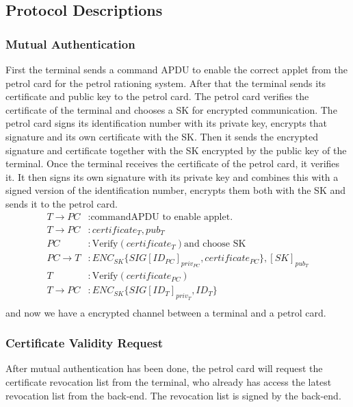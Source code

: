 \subsection{Protocol Descriptions}
\subsubsection{Mutual Authentication}
First the terminal sends a command APDU to enable the correct applet from the petrol card for the petrol rationing system. After that the terminal sends its certificate and public key to the petrol card. The petrol card verifies the certificate of the terminal and chooses a SK for encrypted communication. The petrol card signs its identification number with its private key, encrypts that signature and its own certificate with the SK. Then it sends the encrypted signature and certificate together with the SK encrypted by the public key of the terminal. Once the terminal receives the certificate of the petrol card, it verifies it. It then signs its own signature with its private key and combines this with a signed version of the identification number, encrypts them both with the SK and sends it to the petrol card.
\\

\begin{equation}\nonumber
\begin{split} 
T \to PC &: \text{commandAPDU to enable applet.}\\
T \to PC &: certificate_{T}, pub_{T}\\ 
PC &: \text{Verify}(certificate_{T}) \text{and choose SK}\\
PC \to T &: ENC_{SK}\{SIG[ID_{PC}]_{priv_{PC}}, certificate_{PC}\},  [SK]_{pub_T}\\
T&: \text{Verify}(certificate_{PC})\\
T \to PC &: ENC_{SK}\{SIG[ID_{T}]_{priv_T}, ID_{T}\} \\ 
\end{split} 
\end{equation}
and now we have a encrypted channel between a terminal and a petrol card.

\subsubsection{Certificate Validity Request}
After mutual authentication has been done, the petrol card will request the certificate revocation list from the terminal, who already has access the latest revocation list from the back-end. The revocation list is signed by the back-end. 


